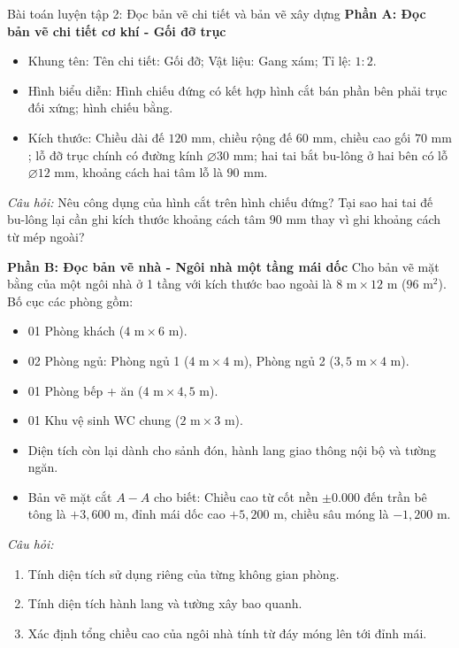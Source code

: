 \documentclass[12pt, a4paper]{article}
\begin{document}
\begin{pedabox}{Bài toán luyện tập 2: Đọc bản vẽ chi tiết và bản vẽ xây dựng}
\textbf{Phần A: Đọc bản vẽ chi tiết cơ khí - Gối đỡ trục}
\begin{itemize}[leftmargin=0.5cm]
    \item Khung tên: Tên chi tiết: Gối đỡ; Vật liệu: Gang xám; Tỉ lệ: $1:2$.
    \item Hình biểu diễn: Hình chiếu đứng có kết hợp hình cắt bán phần bên phải trục đối xứng; hình chiếu bằng.
    \item Kích thước: Chiều dài đế $120\text{ mm}$, chiều rộng đế $60\text{ mm}$, chiều cao gối $70\text{ mm}$; lỗ đỡ trục chính có đường kính $\varnothing 30\text{ mm}$; hai tai bắt bu-lông ở hai bên có lỗ $\varnothing 12\text{ mm}$, khoảng cách hai tâm lỗ là $90\text{ mm}$.
\end{itemize}
\textit{Câu hỏi:} Nêu công dụng của hình cắt trên hình chiếu đứng? Tại sao hai tai đế bu-lông lại cần ghi kích thước khoảng cách tâm $90\text{ mm}$ thay vì ghi khoảng cách từ mép ngoài?

\textbf{Phần B: Đọc bản vẽ nhà - Ngôi nhà một tầng mái dốc}
Cho bản vẽ mặt bằng của một ngôi nhà ở 1 tầng với kích thước bao ngoài là $8\text{ m} \times 12\text{ m}$ ($96\text{ m}^2$). Bố cục các phòng gồm:
\begin{itemize}[leftmargin=0.5cm]
    \item 01 Phòng khách ($4\text{ m} \times 6\text{ m}$).
    \item 02 Phòng ngủ: Phòng ngủ 1 ($4\text{ m} \times 4\text{ m}$), Phòng ngủ 2 ($3{,}5\text{ m} \times 4\text{ m}$).
    \item 01 Phòng bếp + ăn ($4\text{ m} \times 4{,}5\text{ m}$).
    \item 01 Khu vệ sinh WC chung ($2\text{ m} \times 3\text{ m}$).
    \item Diện tích còn lại dành cho sảnh đón, hành lang giao thông nội bộ và tường ngăn.
    \item Bản vẽ mặt cắt $A-A$ cho biết: Chiều cao từ cốt nền $\pm 0.000$ đến trần bê tông là $+3{,}600\text{ m}$, đỉnh mái dốc cao $+5{,}200\text{ m}$, chiều sâu móng là $-1{,}200\text{ m}$.
\end{itemize}
\textit{Câu hỏi:}
\begin{enumerate}[leftmargin=0.6cm]
    \item Tính diện tích sử dụng riêng của từng không gian phòng.
    \item Tính diện tích hành lang và tường xây bao quanh.
    \item Xác định tổng chiều cao của ngôi nhà tính từ đáy móng lên tới đỉnh mái.
\end{enumerate}
\end{pedabox}
\end{document}
